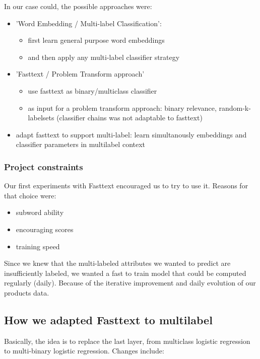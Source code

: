 In our case could, the possible approaches were:
\begin{itemize}
	\item 'Word Embedding / Multi-label Classification':
	\begin{itemize}
		\item first learn general purpose word embeddings
		\item and then apply any multi-label classifier strategy
	\end{itemize}
	\item 'Fasttext / Problem Transform approach'
	\begin{itemize}
		\item use fasttext as binary/multiclass classifier
		\item as input for a problem transform approach: binary relevance, random-k-labelsets (classifier chains was not adaptable to fasttext)
	\end{itemize}
	\item adapt fasttext to support multi-label: learn simultanously embeddings and classifier parameters in multilabel context
\end{itemize}

\subsubsection{Project constraints}


Our first experiments with Fasttext encouraged us to try to use it. Reasons for that choice were:
\begin{itemize}
	\item subword ability
	\item encouraging scores
	\item training speed
\end{itemize}

Since we knew that the multi-labeled attributes we wanted to predict are insufficiently labeled, we wanted a fast to train model that could be computed regularly (daily). Because of the iterative improvement and daily evolution of our products data. 


\subsection{How we adapted Fasttext to multilabel}

Basically, the idea is to replace the last layer, from multiclass logistic regression to multi-binary logistic regression. Changes include:


